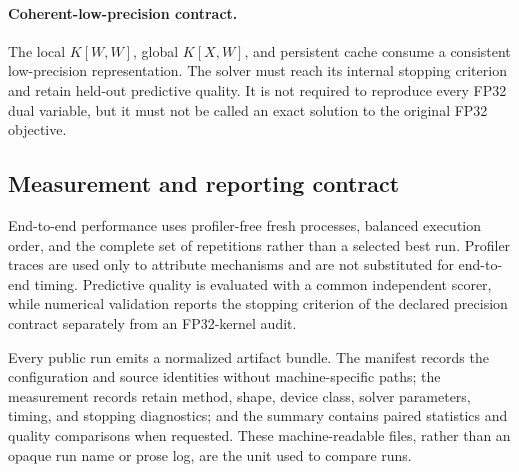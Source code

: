 \paragraph{Coherent-low-precision contract.}
The local $K[W,W]$, global $K[X,W]$, and persistent cache consume a consistent
low-precision representation. The solver must reach its internal stopping
criterion and retain held-out predictive quality. It is not required to
reproduce every FP32 dual variable, but it must not be called an exact solution
to the original FP32 objective.

\subsection{Measurement and reporting contract}

End-to-end performance uses profiler-free fresh processes, balanced execution
order, and the complete set of repetitions rather than a selected best run.
Profiler traces are used only to attribute mechanisms and are not substituted
for end-to-end timing. Predictive quality is evaluated with a common
independent scorer, while numerical validation reports the stopping criterion
of the declared precision contract separately from an FP32-kernel audit.

Every public run emits a normalized artifact bundle. The manifest records the
configuration and source identities without machine-specific paths; the
measurement records retain method, shape, device class, solver parameters,
timing, and stopping diagnostics; and the summary contains paired statistics
and quality comparisons when requested. These machine-readable files, rather
than an opaque run name or prose log, are the unit used to compare runs.
